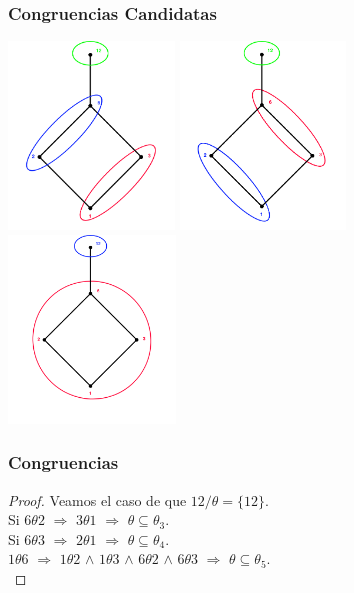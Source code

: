 \documentclass{beamer}
\begin{document}

\begin{frame}
\frametitle{Congruencias Candidatas}
\begin{center}
\includegraphics[height=5cm]{congruencia_3}
\includegraphics[height=5cm]{congruencia_4}
\includegraphics[height=5cm]{congruencia_5}
\end{center}
\end{frame}



\begin{frame}
\frametitle{Congruencias}

\begin{proof}
    \noindent Veamos el caso de que $12/\theta=\{12\}$.\\
    Si $6\theta 2$ $\Rightarrow$ $3\theta 1$ $\Rightarrow$ $\theta \subseteq
    \theta_{3}$.\\
    Si $6\theta 3$ $\Rightarrow$ $2\theta 1$ $\Rightarrow$ $\theta \subseteq
    \theta_{4}$.\\
    $1\theta 6$ $\Rightarrow$ $1\theta 2$ $\wedge$ $1\theta 3$ $\wedge$ $6\theta 2$
    $\wedge$ $6\theta 3$ $\Rightarrow$ $\theta \subseteq
    \theta_{5}$.\\
\end{proof}
\end{frame}
\end{document}
